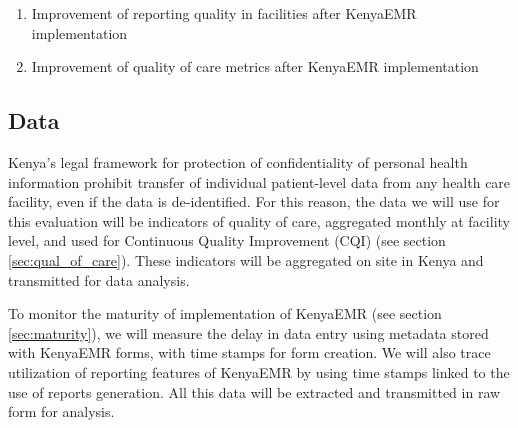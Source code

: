 \documentclass[a4paper,11pt,draft,twoside]{article}
\begin{document}
\begin{enumerate}
\item	Improvement of reporting quality in facilities after KenyaEMR implementation
\item	Improvement of quality of care metrics after KenyaEMR implementation
\end{enumerate}

    \subsection{Data}

Kenya’s legal framework for protection of confidentiality of personal health information prohibit transfer of individual patient-level data from any health care facility, even if the data is de-identified. For this reason, the data we will use for this evaluation will be indicators of quality of care, aggregated monthly at facility level, and used for Continuous Quality Improvement (CQI) (see section \ref{sec:qual_of_care}). These indicators will be aggregated on site in Kenya and transmitted for data analysis.

To monitor the maturity of implementation of KenyaEMR (see section \ref{sec:maturity}), we will measure the delay in data entry using metadata stored with KenyaEMR forms, with time stamps for form creation. We will also trace utilization of reporting features of KenyaEMR by using time stamps linked to the use of reports generation. All this data will be extracted and transmitted in raw form for analysis.
\end{document}
